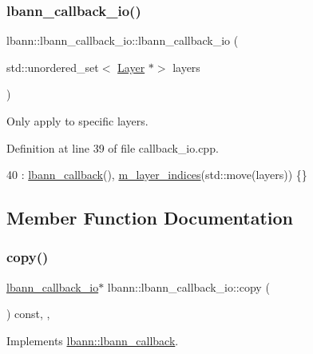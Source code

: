\subsubsection{\texorpdfstring{lbann\+\_\+callback\+\_\+io()}{lbann\_callback\_io()}\hspace{0.1cm}{\footnotesize\ttfamily [3/3]}}
{\footnotesize\ttfamily lbann\+::lbann\+\_\+callback\+\_\+io\+::lbann\+\_\+callback\+\_\+io (\begin{DoxyParamCaption}\item[{std\+::unordered\+\_\+set$<$ \hyperlink{classlbann_1_1Layer}{Layer} $\ast$$>$}]{layers }\end{DoxyParamCaption})}

Only apply to specific layers. 

Definition at line 39 of file callback\+\_\+io.\+cpp.


\begin{DoxyCode}
40                                     : \hyperlink{classlbann_1_1lbann__callback_a679057298a41ddd47f08c157f756c584}{lbann\_callback}(), 
      \hyperlink{classlbann_1_1lbann__callback__io_ab2105f5ed94c9c053b2873ea3a87bc21}{m\_layer\_indices}(std::move(layers)) \{\}
\end{DoxyCode}


\subsection{Member Function Documentation}
\mbox{\label{classlbann_1_1lbann__callback__io_aec8c75427c424999d01a18a9fb8e0b0d}} 
\subsubsection{\texorpdfstring{copy()}{copy()}}
{\footnotesize\ttfamily \hyperlink{classlbann_1_1lbann__callback__io}{lbann\+\_\+callback\+\_\+io}$\ast$ lbann\+::lbann\+\_\+callback\+\_\+io\+::copy (\begin{DoxyParamCaption}{ }\end{DoxyParamCaption}) const\hspace{0.3cm}{\ttfamily [inline]}, {\ttfamily [override]}, {\ttfamily [virtual]}}



Implements \hyperlink{classlbann_1_1lbann__callback_a9f545d1269a8c7af335625d049691f26}{lbann\+::lbann\+\_\+callback}.



